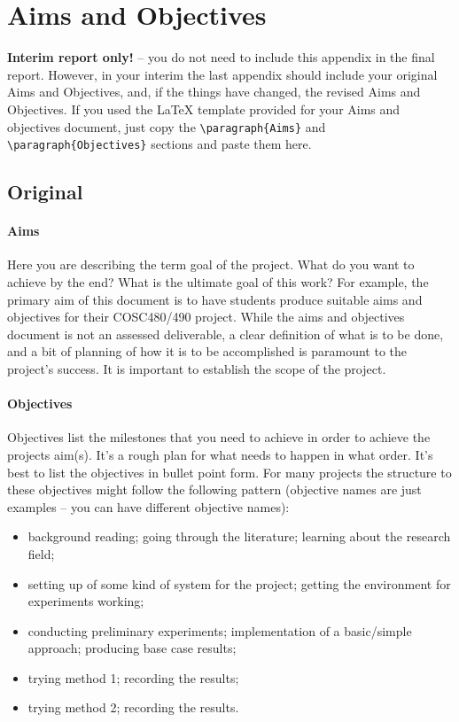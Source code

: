 \documentclass[12pt]{article}
\begin{document}
\section{Aims and Objectives}

\textbf{Interim report only!} -- you do not need to include this appendix in the final report.  However, in your interim the last appendix should include your original Aims and Objectives, and, if the things have changed, the revised Aims and Objectives. If you used the \LaTeX{} template provided for your Aims and objectives document, just copy the \verb$\paragraph{Aims}$ and \verb$\paragraph{Objectives}$ sections and paste them here.

\subsection*{Original}

\paragraph{Aims}
Here you are describing the term goal of the project. What do you want to achieve by the end?  What is the ultimate goal of this work?  For example, the primary aim of this document is to have students produce suitable aims and objectives for their COSC480/490 project. While the aims and objectives document is not an assessed deliverable, a clear definition of what is to be done, and a bit of planning of how it is to be accomplished is paramount to the project's success. It is important to establish the scope of the project.

\paragraph{Objectives}
Objectives list the milestones that you need to achieve in order to achieve the projects aim(s). It's a rough plan for what needs to happen in what order. It's best to list the objectives in bullet point form. For many projects the structure to these objectives might follow the following pattern (objective names are just examples -- you can have different objective names):    
\begin{itemize}[noitemsep]
\item background reading; going through the literature; learning about the research field;
\item setting up of some kind of system for the project; getting the environment for experiments working;
\item conducting preliminary experiments; implementation of a basic/simple approach; producing base case results;
\item trying method 1; recording the results;
\item trying method 2; recording the results.
\end{itemize}
\end{document}
